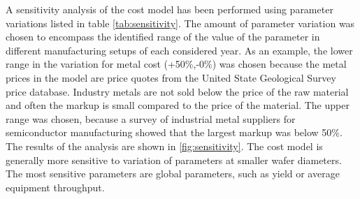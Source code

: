 \documentclass[10pt]{article}
\begin{document}
A sensitivity analysis of the cost model has been performed using parameter variations listed in table \cref{tab:sensitivity}. The amount of parameter variation was chosen to encompass the identified range of the value of the parameter in different manufacturing setups of each considered year. As an example, the lower range in the variation for metal cost (+50\%,-0\%) was chosen because the metal prices in the model are price quotes from the United State Geological Survey price database. Industry metals are not sold below the price of the raw material and often the markup is small compared to the price of the material. The upper range was chosen, because a survey of industrial metal suppliers for semiconductor manufacturing showed that the largest markup was below 50\%. The results of the analysis are shown in  \cref{fig:sensitivity}. The cost model is generally more sensitive to variation of parameters at smaller wafer diameters. The most sensitive parameters are global parameters, such as yield or average equipment throughput.
\end{document}
